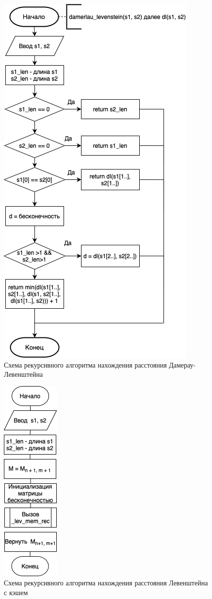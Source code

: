 \documentclass[14pt,russian]{scrartcl}
\begin{document}
\begin{figure}[h]
	\centering
	\includegraphics[scale=0.85]{dam_lev_rec.png}
	\caption{Схема рекурсивного алгоритма нахождения расстояния Дамерау-Левенштейна}
	\label{fig:rec_dam_lev}
\end{figure}

\begin{figure}[h]
	\centering
	\includegraphics[scale=1]{lev_cache_main.png}
	\caption{Схема рекурсивного алгоритма нахождения расстояния Левенштейна с кэшем}
	\label{fig:rec_lev_cache_main}
\end{figure}
\end{document}
